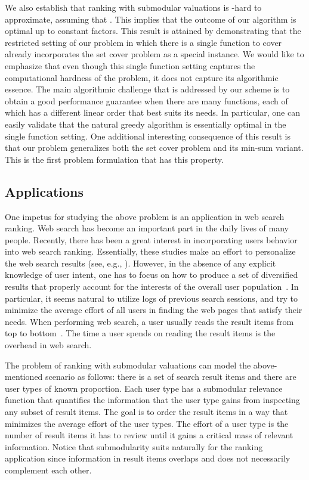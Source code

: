 \documentclass[11pt]{article}
\theoremstyle{plain}
\theoremstyle{definition}
\begin{document}
We also establish that ranking with submodular valuations is
-hard to approximate, assuming that
. This implies that the outcome of
our algorithm is optimal up to constant factors. This result is
attained by demonstrating that the restricted setting of our
problem in which there is a single function to cover already
incorporates the set cover problem as a special instance. We would
like to emphasize that even though this single function setting
captures the computational hardness of the problem, it does not
capture its algorithmic essence. The main algorithmic challenge
that is addressed by our scheme is to obtain a good performance
guarantee when there are many functions, each of which has a
different linear order that best suits its needs. In particular,
one can easily validate that the natural greedy algorithm is
essentially optimal in the single function setting. One additional
interesting consequence of this result is that our problem
generalizes both the set cover problem and its min-sum variant.
This is the first problem formulation that has this property.


\subsection{Applications} \label{subsec:Applications}

 One impetus for studying the
above problem is an application in web search ranking. Web search
has become an important part in the daily lives of many people.
Recently, there has been a great interest in incorporating users
behavior into web search ranking. Essentially, these studies make
an effort to personalize the web search results (see, e.g.,
\cite{TeevanDH05,AgichteinBD06,DouSW07,DupretP08}). However, in
the absence of any explicit knowledge of user intent, one has to
focus on how to produce a set of diversified results that properly
account for the interests of the overall user
population~\cite{ClarkeKCVABM08,AgrawalGHI09}. In particular, it
seems natural to utilize logs of previous search sessions, and try
to minimize the average effort of all users in finding the web
pages that satisfy their needs. When performing web search, a user
usually reads the result items from top to
bottom~\cite{JoachimsGPHRG07}. The time a user spends on reading
the result items is the overhead in web search.

The problem of ranking with submodular valuations can model the
above-mentioned scenario as follows: there is a set of  search
result items and there are  user types of known proportion.
Each user type has a submodular relevance function that quantifies
the information that the user type gains from inspecting any
subset of result items. The goal is to order the result items in a
way that minimizes the average effort of the user types. The
effort of a user type is the number of result items it has to
review until it gains a critical mass of relevant information.
Notice that submodularity suits naturally for the ranking
application since information in result items overlaps and does
not necessarily complement each other.
\end{document}
